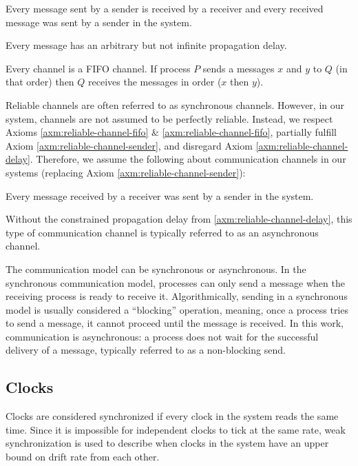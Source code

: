 \begin{axm}
    \label{axm:reliable-channel-sender}
    Every message sent by a sender is received by a receiver and every received message was sent by a sender in the system. \cite{DISTRIBUTED}
\end{axm}

\begin{axm}
    \label{axm:reliable-channel-delay}
    Every message has an arbitrary but not infinite propagation delay.\cite{DISTRIBUTED}
\end{axm}

\begin{axm}
    \label{axm:reliable-channel-fifo}
    Every channel is a \ac{FIFO} channel. If process $P$ sends a messages $x$ and $y$ to $Q$ (in that order) then $Q$ receives the messages in order ($x$ then $y$).\cite{DISTRIBUTED}
\end{axm}

Reliable channels are often referred to as synchronous channels.
However, in our system, channels are not assumed to be perfectly reliable.
Instead, we respect Axioms \ref{axm:reliable-channel-fifo} \& \ref{axm:reliable-channel-fifo}, partially fulfill Axiom \ref{axm:reliable-channel-sender}, and disregard Axiom \ref{axm:reliable-channel-delay}.
Therefore, we assume the following about communication channels in our systems (replacing Axiom \ref{axm:reliable-channel-sender}):

\begin{axm}
    Every message received by a receiver was sent by a sender in the system.
\end{axm}

Without the constrained propagation delay from \ref{axm:reliable-channel-delay}, this type of communication channel is typically referred to as an asynchronous channel.

The communication model can be synchronous or asynchronous.
In the synchronous communication model, processes can only send a message when the receiving process is ready to receive it.
Algorithmically, sending in a synchronous model is usually considered a ``blocking'' operation, meaning, once a process tries to send a message, it cannot proceed until the message is received.
In this work, communication is asynchronous: a process does not wait for the successful delivery of a message, typically referred to as a non-blocking send.

\subsection{Clocks}
Clocks are considered synchronized if every clock in the system reads the same time.
Since it is impossible for independent clocks to tick at the same rate, weak synchronization is used to describe when clocks in the system have an upper bound on drift rate from each other.

